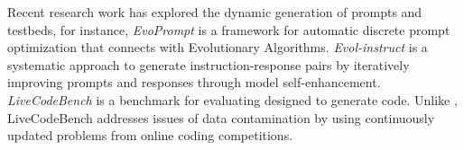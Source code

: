 Recent research work has explored the dynamic generation of prompts and testbeds, for instance, \textit{EvoPrompt} is a framework for automatic discrete prompt optimization that connects \llms with Evolutionary Algorithms\cite{guo_connecting_2024}. \textit{Evol-instruct} is a systematic approach to generate instruction-response pairs by iteratively improving prompts and responses through model self-enhancement\cite{xu_wizardlm_2023}. \textit{LiveCodeBench} is a benchmark for evaluating \llms designed to generate code\cite{jain_livecodebench_2024}. Unlike \snipgen, LiveCodeBench addresses issues of data contamination by using continuously updated problems from online coding competitions. 


 

